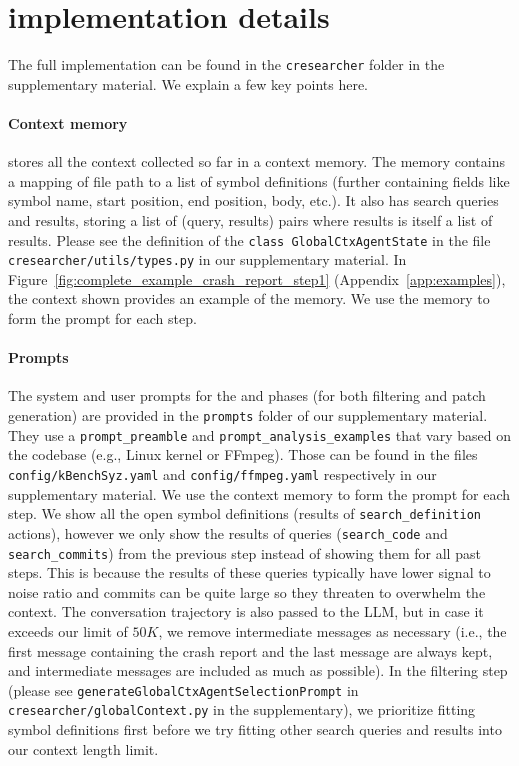 \section{\cresearcher{} implementation details} \label{app:design}

The full implementation can be found in the \texttt{cresearcher} folder in the supplementary material. We explain a few key points here.

\paragraph{Context memory}
\cresearcher{} stores all the context collected so far in a context memory. The memory contains a mapping of file path to a list of symbol definitions (further containing fields like symbol name, start position, end position, body, etc.). It also has search queries and results, storing a list of (query, results) pairs where results is itself a list of results. Please see the definition of the \texttt{class GlobalCtxAgentState} in the file \texttt{cresearcher/utils/types.py} in our supplementary material. In Figure~\ref{fig:complete_example_crash_report_step1} (Appendix~\ref{app:examples}), the context shown provides an example of the memory.
We use the memory to form the prompt for each step. 


\paragraph{Prompts}
The system and user prompts for the \analysisphase{} and \synthesisphase{} phases (for both filtering and patch generation) are provided in the \texttt{prompts} folder of our supplementary material. They use a \texttt{prompt\_preamble} and \texttt{prompt\_analysis\_examples} that vary based on the codebase (e.g., Linux kernel or FFmpeg). Those can be found in the files \texttt{config/kBenchSyz.yaml} and \texttt{config/ffmpeg.yaml} respectively in our supplementary material.
We use the context memory to form the prompt for each step. We show all the open symbol definitions (results of \texttt{search\_definition} actions), however we only show the results of queries (\texttt{search\_code} and \texttt{search\_commits}) from the previous step instead of showing them for all past steps. This is because the results of these queries typically have lower signal to noise ratio and commits can be quite large so they threaten to overwhelm the context. The conversation trajectory is also passed to the LLM, but in case it exceeds our limit of $50K$, we remove intermediate messages as necessary (i.e., the first message containing the crash report and the last message are always kept, and intermediate messages are included as much as possible).
In the filtering step (please see \texttt{generateGlobalCtxAgentSelectionPrompt} in \texttt{cresearcher/globalContext.py} in the supplementary), we prioritize fitting symbol definitions first before we try fitting other search queries and results into our context length limit.

